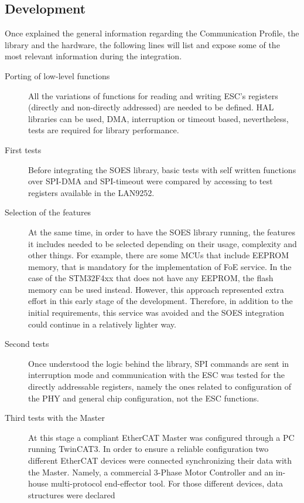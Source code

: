 \subsection{Development}

Once explained the general information regarding the Communication Profile, the library and the hardware, the following lines will list and
expose some of the most relevant information during the integration. 

\begin{description}
\item[Porting of low-level functions] All the variations of functions for reading and writing ESC's registers (directly and non-directly addressed)
      are needed to be defined. HAL libraries can be used, DMA, interruption or timeout based, nevertheless, tests are required for library performance.
\item[First tests] Before integrating the SOES library, basic tests with self written functions over SPI-DMA and SPI-timeout were compared by accessing
      to test registers available in the LAN9252.
\item[Selection of the features] At the same time, in order to have the SOES library running, the features it includes needed to be selected depending on
      their usage, complexity and other things. For example, there are some MCUs that include EEPROM memory, that is mandatory for the implementation of FoE service.
      In the case of the STM32F4xx that does not have any EEPROM, the flash memory can be used instead. However, this approach represented extra effort
      in this early stage of the development. Therefore, in addition to the initial requirements, this service was avoided and the SOES integration could
      continue in a relatively lighter way.
\item[Second tests] Once understood the logic behind the library, SPI commands are sent in interruption mode and communication with the ESC was tested for the
      directly addressable registers, namely the ones related to configuration of the PHY and general chip configuration, not the ESC functions.
\item[Third tests with the Master] At this stage a compliant EtherCAT Master was configured through a PC running TwinCAT3. 
      In order to ensure a reliable configuration two different EtherCAT devices were connected synchronizing their data with the Master. Namely, 
      a commercial 3-Phase Motor Controller and an in-house multi-protocol end-effector tool. For those different devices, data structures were declared 

\end{description}
